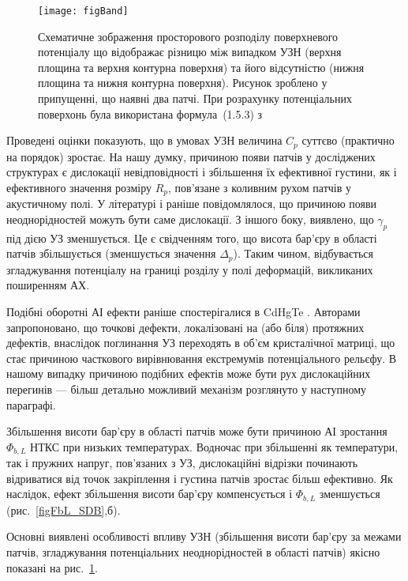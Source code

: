 \begin{figure}
\center
\texttt{[image: figBand]}
\caption{\label{figBand}
Схематичне зображення
просторового розподілу поверхневого потенціалу
що відображає різницю між випадком УЗН (верхня площина та верхня контурна поверхня) та
його відсутністю (нижня площина та нижня контурна поверхня).
Рисунок зроблено у припущенні, що наявні два патчі.
При розрахунку потенціальних поверхонь була використана формула~(1.5.3) з \cite{Tung:MSE}
}%
\end{figure}

Проведені оцінки показують,
що в умовах УЗН величина $C_p$ суттєво (практично на порядок) зростає.
На нашу думку, причиною появи патчів у досліджених структурах є дислокації невідповідності і збільшення їх ефективної густини, як і ефективного значення розміру $R_p$,
пов'язане з коливним рухом патчів у акустичному полі.
У літературі \cite{GELCZUK2014} і раніше повідомлялося, що причиною появи неоднорідностей можуть бути саме дислокації.
З іншого боку, виявлено, що $\gamma_p$ під дією УЗ зменшується.
Це є свідченням того, що висота бар'єру в області патчів збільшується (зменшується значення $\Delta_p$).
Таким чином, відбувається згладжування потенціалу на границі розділу у полі деформацій, викликаних поширенням АХ.

Подібні оборотні АІ ефекти раніше спостерігалися в CdHgTe \cite{Vlasenko2000r}.
Авторами \cite{Vlasenko2000r} запропоновано, що точкові дефекти, локалізовані на (або біля) протяжних дефектів, внаслідок поглинання УЗ переходять в об'єм кристалічної матриці,
що стає причиною часткового вирівнювання екстремумів потенціального рельєфу.
В нашому  випадку причиною подібних ефектів може бути рух дислокаційних перегинів --- більш детально можливий механізм розглянуто у наступному параграфі.

Збільшення висоти бар'єру в області патчів може бути причиною АІ зростання $\Phi_{b,L}$ НТКС при низьких температурах.
Водночас при збільшенні як температури, так і пружних напруг, пов'язаних з УЗ,
дислокаційні відрізки починають відриватися від точок закріплення
 і густина патчів зростає більш ефективно.
Як наслідок, ефект збільшення висоти бар'єру компенсується і $\Phi_{b,L}$ зменшується (рис.~\ref{figFbL_SDB},б).


Основні виявлені особливості впливу УЗН (збільшення висоти бар'єру за межами патчів, згладжування потенціальних неоднорідностей в області патчів) якісно показані на рис.~\ref{figBand}.





